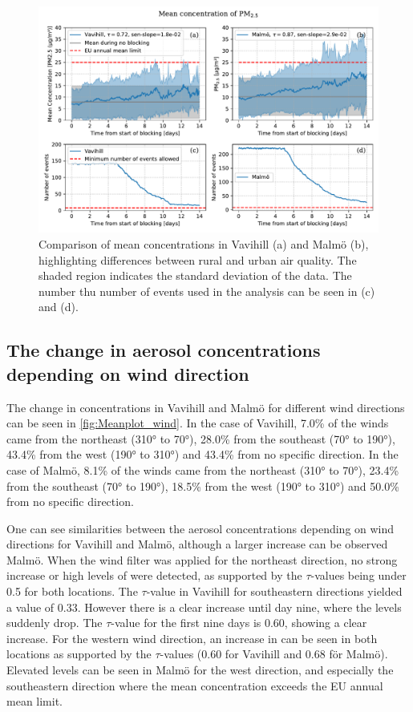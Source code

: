 \begin{figure}[H]
    \centering
    \includegraphics[width=\textwidth]{Figures/Meanplot.pdf}
    \caption{Comparison of mean \PM  concentrations in Vavihill (a) and Malmö (b), highlighting differences between rural and urban air quality. The shaded region indicates the standard deviation of the data. The number thu number of events used in the analysis can be seen in (c) and (d).}
    \label{fig:Meanplot_Comparison}
\end{figure}

\subsection{The change in aerosol concentrations depending on wind direction}

The change in \PM concentrations in Vavihill and Malmö for different wind directions can be seen in \autoref{fig:Meanplot_wind}. In the case of Vavihill, 7.0\% of the winds came from the northeast (310° to 70°), 28.0\% from the southeast (70° to 190°), 43.4\% from the west (190° to 310°) and 43.4\% from no specific direction. In the case of Malmö, 8.1\% of the winds came from the northeast (310° to 70°), 23.4\% from the southeast (70° to 190°), 18.5\% from the west (190° to 310°) and 50.0\% from no specific direction. 

One can see similarities between the aerosol concentrations depending on wind directions for Vavihill and Malmö, although a larger increase can be observed Malmö. When the wind filter was applied for the northeast direction, no strong increase or high levels of \PM  were detected, as supported by the $\tau$-values being under 0.5 for both locations. The $\tau$-value in Vavihill for southeastern directions yielded a value of 0.33. However there is a clear increase until day nine, where the levels suddenly drop. The $\tau$-value for the first nine days is 0.60, showing a clear increase. For the western wind direction, an increase in \PM can be seen in both locations as supported by the $\tau$-values (0.60 for Vavihill and 0.68 för Malmö). Elevated levels can be seen in Malmö for the west direction, and especially the southeastern direction where the mean concentration exceeds the EU annual mean limit. 

